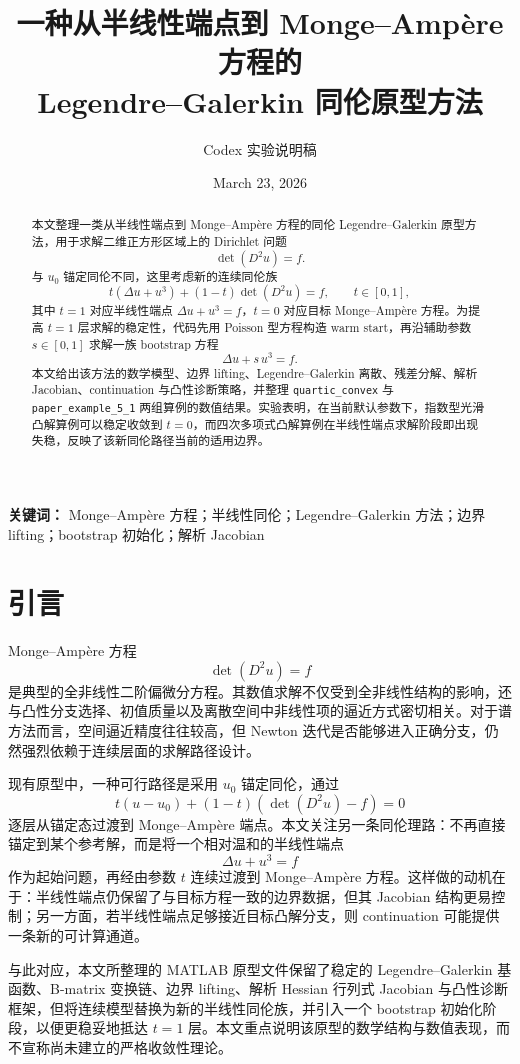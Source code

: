 \documentclass[11pt,a4paper]{article}
\title{一种从半线性端点到 Monge--Amp\`ere 方程的\\Legendre--Galerkin 同伦原型方法}
\author{Codex 实验说明稿}
\date{March 23, 2026}
\begin{document}
\maketitle

\begin{abstract}
本文整理一类从半线性端点到 Monge--Amp\`ere 方程的同伦 Legendre--Galerkin 原型方法，用于求解二维正方形区域上的 Dirichlet 问题
\[
\det(D^2u)=f.
\]
与 $u_0$ 锚定同伦不同，这里考虑新的连续同伦族
\[
t(\Delta u+u^3)+(1-t)\det(D^2u)=f,\qquad t\in[0,1],
\]
其中 $t=1$ 对应半线性端点 $\Delta u+u^3=f$，$t=0$ 对应目标 Monge--Amp\`ere 方程。为提高 $t=1$ 层求解的稳定性，代码先用 Poisson 型方程构造 warm start，再沿辅助参数 $s\in[0,1]$ 求解一族 bootstrap 方程
\[
\Delta u+s\,u^3=f.
\]
本文给出该方法的数学模型、边界 lifting、Legendre--Galerkin 离散、残差分解、解析 Jacobian、continuation 与凸性诊断策略，并整理 \texttt{quartic\_convex} 与 \texttt{paper\_example\_5\_1} 两组算例的数值结果。实验表明，在当前默认参数下，指数型光滑凸解算例可以稳定收敛到 $t=0$，而四次多项式凸解算例在半线性端点求解阶段即出现失稳，反映了该新同伦路径当前的适用边界。
\end{abstract}

\noindent\textbf{关键词：}
Monge--Amp\`ere 方程；半线性同伦；Legendre--Galerkin 方法；边界 lifting；bootstrap 初始化；解析 Jacobian

\section{引言}
Monge--Amp\`ere 方程
\begin{equation}
\det(D^2u)=f
\label{eq:ma}
\end{equation}
是典型的全非线性二阶偏微分方程。其数值求解不仅受到全非线性结构的影响，还与凸性分支选择、初值质量以及离散空间中非线性项的逼近方式密切相关。对于谱方法而言，空间逼近精度往往较高，但 Newton 迭代是否能够进入正确分支，仍然强烈依赖于连续层面的求解路径设计。

现有原型中，一种可行路径是采用 $u_0$ 锚定同伦，通过
\[
t(u-u_0)+(1-t)(\det(D^2u)-f)=0
\]
逐层从锚定态过渡到 Monge--Amp\`ere 端点。本文关注另一条同伦理路：不再直接锚定到某个参考解，而是将一个相对温和的半线性端点
\[
\Delta u+u^3=f
\]
作为起始问题，再经由参数 $t$ 连续过渡到 Monge--Amp\`ere 方程。这样做的动机在于：半线性端点仍保留了与目标方程一致的边界数据，但其 Jacobian 结构更易控制；另一方面，若半线性端点足够接近目标凸解分支，则 continuation 可能提供一条新的可计算通道。

与此对应，本文所整理的 MATLAB 原型文件保留了稳定的 Legendre--Galerkin 基函数、B-matrix 变换链、边界 lifting、解析 Hessian 行列式 Jacobian 与凸性诊断框架，但将连续模型替换为新的半线性同伦族，并引入一个 bootstrap 初始化阶段，以便更稳妥地抵达 $t=1$ 层。本文重点说明该原型的数学结构与数值表现，而不宣称尚未建立的严格收敛性理论。
\end{document}
